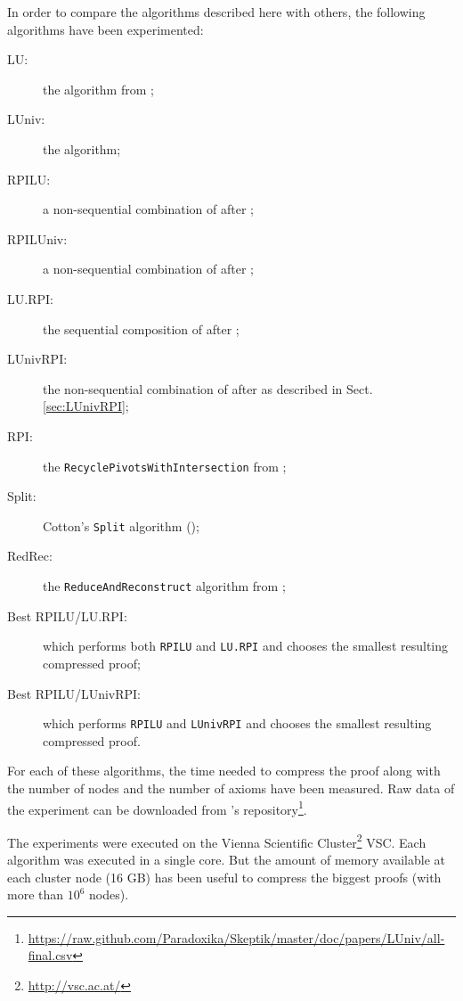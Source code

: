 \documentclass{llncs}
\begin{document}
In order to compare the algorithms described here with others, the following algorithms have been experimented:
\begin{description}
  \item[LU:] the {\LowerUnits} algorithm from \cite{LURPI};
  \item[LUniv:] the {\LowerUnivalents} algorithm;
  \item[RPILU:] a non-sequential combination of {\RPI} after {\LowerUnits};
  \item[RPILUniv:] a non-sequential combination of {\RPI} after {\LowerUnivalents};
  \item[LU.RPI:] the sequential composition of {\LowerUnits} after {\RPI};
  \item[LUnivRPI:] the non-sequential combination of {\LowerUnivalents} after {\RPI} as described in Sect. \ref{sec:LUnivRPI};
  \item[RPI:] the \texttt{RecyclePivotsWithIntersection} from \cite{LURPI};
  \item[Split:] Cotton's \texttt{Split} algorithm (\cite{CottonSplit});
  \item[RedRec:] the \texttt{ReduceAndReconstruct} algorithm from \cite{RedRec};
  \item[Best RPILU/LU.RPI:] which performs both \texttt{RPILU} and \texttt{LU.RPI} and chooses the smallest resulting compressed proof;
  \item[Best RPILU/LUnivRPI:] which performs \texttt{RPILU} and \texttt{LUnivRPI} and chooses the smallest resulting
    compressed proof.
\end{description}

For each of these algorithms, the time needed to compress the proof along with the number of nodes
and the number of axioms have been measured. Raw data of the experiment can be downloaded from {\skeptik}'s repository\footnote{\url{https://raw.github.com/Paradoxika/Skeptik/master/doc/papers/LUniv/all-final.csv}}.

The experiments were executed on the Vienna Scientific Cluster\footnote{\url{http://vsc.ac.at/}}
VSC. Each algorithm was executed in a single core. But the amount of memory available
at each cluster node (16 GB) has been useful to compress the biggest proofs (with more than $10^6$ nodes).
\end{document}
